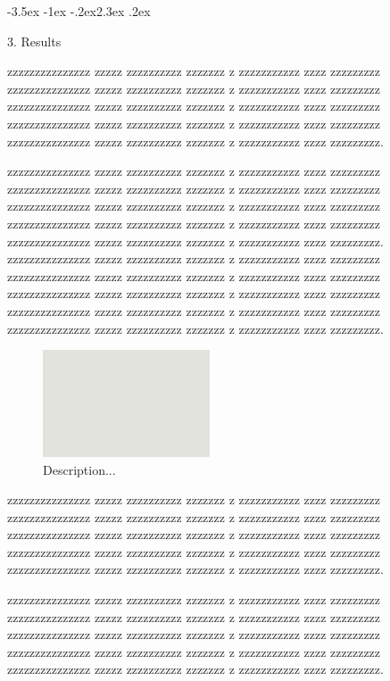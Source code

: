 \documentclass[prl,twocolumn]{revtex4-1}
\makeatletter
\renewcommand{\section}{\@startsection{section}{1}{\z@}%
	{-3.5ex \@plus -1ex \@minus -.2ex}{2.3ex \@plus.2ex}%
	{\normalfont\bfseries\raggedright}}
\numberwithin{equation}{section}
\makeatother
\begin{document}
\section{3. Results}



  zzzzzzzzzzzzzzz zzzzz zzzzzzzzzz zzzzzzz z zzzzzzzzzzz zzzz zzzzzzzzz
  zzzzzzzzzzzzzzz zzzzz zzzzzzzzzz zzzzzzz z zzzzzzzzzzz zzzz zzzzzzzzz
  zzzzzzzzzzzzzzz zzzzz zzzzzzzzzz zzzzzzz z zzzzzzzzzzz zzzz zzzzzzzzz
  zzzzzzzzzzzzzzz zzzzz zzzzzzzzzz zzzzzzz z zzzzzzzzzzz zzzz zzzzzzzzz
  zzzzzzzzzzzzzzz zzzzz zzzzzzzzzz zzzzzzz z zzzzzzzzzzz zzzz zzzzzzzzz.

  zzzzzzzzzzzzzzz zzzzz zzzzzzzzzz zzzzzzz z zzzzzzzzzzz zzzz zzzzzzzzz
  zzzzzzzzzzzzzzz zzzzz zzzzzzzzzz zzzzzzz z zzzzzzzzzzz zzzz zzzzzzzzz
  zzzzzzzzzzzzzzz zzzzz zzzzzzzzzz zzzzzzz z zzzzzzzzzzz zzzz zzzzzzzzz
  zzzzzzzzzzzzzzz zzzzz zzzzzzzzzz zzzzzzz z zzzzzzzzzzz zzzz zzzzzzzzz
  zzzzzzzzzzzzzzz zzzzz zzzzzzzzzz zzzzzzz z zzzzzzzzzzz zzzz zzzzzzzzz.
  zzzzzzzzzzzzzzz zzzzz zzzzzzzzzz zzzzzzz z zzzzzzzzzzz zzzz zzzzzzzzz
  zzzzzzzzzzzzzzz zzzzz zzzzzzzzzz zzzzzzz z zzzzzzzzzzz zzzz zzzzzzzzz
  zzzzzzzzzzzzzzz zzzzz zzzzzzzzzz zzzzzzz z zzzzzzzzzzz zzzz zzzzzzzzz
  zzzzzzzzzzzzzzz zzzzz zzzzzzzzzz zzzzzzz z zzzzzzzzzzz zzzz zzzzzzzzz
  zzzzzzzzzzzzzzz zzzzz zzzzzzzzzz zzzzzzz z zzzzzzzzzzz zzzz zzzzzzzzz.
  
\begin{figure}[!tb]
  \includegraphics[width=0.44\textwidth]{fig1a.png}
  \caption{Description...}
  \label{fig:y}
\end{figure}

  zzzzzzzzzzzzzzz zzzzz zzzzzzzzzz zzzzzzz z zzzzzzzzzzz zzzz zzzzzzzzz
  zzzzzzzzzzzzzzz zzzzz zzzzzzzzzz zzzzzzz z zzzzzzzzzzz zzzz zzzzzzzzz
  zzzzzzzzzzzzzzz zzzzz zzzzzzzzzz zzzzzzz z zzzzzzzzzzz zzzz zzzzzzzzz
  zzzzzzzzzzzzzzz zzzzz zzzzzzzzzz zzzzzzz z zzzzzzzzzzz zzzz zzzzzzzzz
  zzzzzzzzzzzzzzz zzzzz zzzzzzzzzz zzzzzzz z zzzzzzzzzzz zzzz zzzzzzzzz.

  

  zzzzzzzzzzzzzzz zzzzz zzzzzzzzzz zzzzzzz z zzzzzzzzzzz zzzz zzzzzzzzz
  zzzzzzzzzzzzzzz zzzzz zzzzzzzzzz zzzzzzz z zzzzzzzzzzz zzzz zzzzzzzzz
  zzzzzzzzzzzzzzz zzzzz zzzzzzzzzz zzzzzzz z zzzzzzzzzzz zzzz zzzzzzzzz
  zzzzzzzzzzzzzzz zzzzz zzzzzzzzzz zzzzzzz z zzzzzzzzzzz zzzz zzzzzzzzz
  zzzzzzzzzzzzzzz zzzzz zzzzzzzzzz zzzzzzz z zzzzzzzzzzz zzzz zzzzzzzzz.
  
\end{document}
